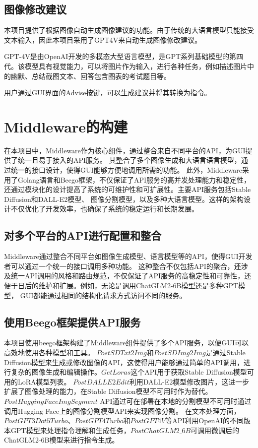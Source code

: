 \documentclass[a4paper,AutoFakeBold,oneside,12pt]{book}
\begin{document}
\subsection{图像修改建议}
本项目提供了根据图像自动生成图像建议的功能。由于传统的大语言模型只能接受文本输入，因此本项目采用了GPT4V来自动生成图像修改建议。

GPT-4V是由OpenAI开发的多模态大型语言模型，是GPT系列基础模型的第四代。该模型具有视觉能力，可以将图片作为输入，进行各种任务，例如描述图片中的幽默、总结截图文本、回答包含图表的考试题目等。

用户通过GUI界面的Advise按键，可以生成建议并将其转换为指令。

\section{Middleware的构建} %
在本项目中，Middleware作为核心组件，通过整合来自不同平台的API，为GUI提供了统一且易于接入的API服务。
其整合了多个图像生成和大语言语言模型，通过统一的接口设计，使得GUI能够方便地调用所需的功能。
此外，Middleware采用了Golang语言和Beego框架，不仅保证了API服务的高并发处理能力和稳定性，
还通过模块化的设计提高了系统的可维护性和可扩展性。主要API服务包括Stable Diffusion和DALL-E2模型、
图像分割模型，以及多种大语言模型。这样的架构设计不仅优化了开发效率，也确保了系统的稳定运行和长期发展。
\subsection{对多个平台的API进行配置和整合}
Middleware通过整合不同平台如图像生成模型、语言模型等的API，使得GUI开发者可以通过一个统一的接口调用多种功能。
这种整合不仅包括API的聚合，还涉及统一API调用的风格和路由规范，不仅保证了API服务的高稳定性和可靠性，还便于日后的维护和扩展。例如，无论是调用ChatGLM2-6B模型还是多种GPT模型，
GUI都能通过相同的结构化请求方式访问不同的服务。


\subsection{使用Beego框架提供API服务}
本项目使用beego框架构建了Middleware组件提供了多个API服务，以便GUI可以高效地使用各种模型和工具。
$PostSDTxt2Img$和$PostSDImg2Img$是通过Stable Diffusion模型来生成或修改图像的API，这使得用户能够通过简单的API调用，进行复杂的图像生成和编辑操作。$GetLoras$这个API用于获取Stable Diffusion模型可用的LoRA模型列表。
$PostDALLE2Edit$利用DALL-E2模型修改图片，这进一步扩展了图像处理的能力，在Stable Diffusion模型不可用时作为替代。
$PostHuggingFaceImgSegment$ API通过可在部署在本地的分割模型不可用时通过调用Hugging Face上的图像分割模型API来实现图像分割。
在文本处理方面，$PostGPT3Dot5Turbo$、$PostGPT4Turbo$和$PostGPT4V$等API利用OpenAI的不同版本GPT模型来处理指令理解和生成任务，$PostChatGLM2\_6B$可调用微调后的ChatGLM2-6B模型来进行指令生成。
\end{document}

